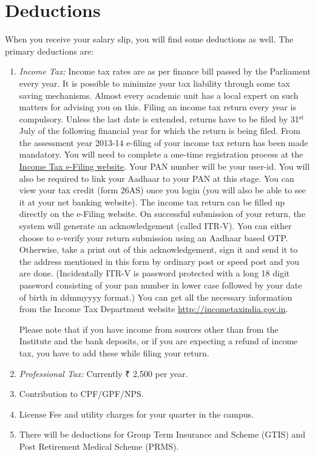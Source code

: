\documentclass[
  10pt,
  a5paper,
  10pt,
  openany]{amsbook}
\begin{document}
\section{Deductions}\label{deductions}

When you receive your salary slip, you will find some deductions as
well. The primary deductions are:

\begin{enumerate}
\def\labelenumi{\arabic{enumi}.}
\item
  \emph{Income Tax:} Income tax rates are as per finance bill passed by
  the Parliament every year. It is possible to minimize your tax
  liability through some tax saving mechanisms. Almost every academic
  unit has a local expert on such matters for advising you on this.
  Filing an income tax return every year is compulsory. Unless the last
  date is extended, returns have to be filed by 31\(^{\text{st}}\) July
  of the following financial year for which the return is being filed.
  From the assessment year 2013-14 e-filing of your income tax return
  has been made mandatory. You will need to complete a one-time
  registration process at the
  \href{https://www.incometax.gov.in/iec/foportal/}{Income Tax e-Filing
  website}. Your PAN number will be your user-id. You will also be
  required to link your Aadhaar to your PAN at this stage. You can view
  your tax credit (form 26AS) once you login (you will also be able to
  see it at your net banking website). The income tax return can be
  filled up directly on the e-Filing website. On successful submission
  of your return, the system will generate an acknowledgement (called
  ITR-V). You can either choose to e-verify your return submission using
  an Aadhaar based OTP. Otherwise, take a print out of this
  acknowledgement, sign it and send it to the address mentioned in this
  form by ordinary post or speed post and you are done. (Incidentally
  ITR-V is password protected with a long 18 digit password consisting
  of your pan number in lower case followed by your date of birth in
  ddmmyyyy format.) You can get all the necessary information from the
  Income Tax Department website \url{http://incometaxindia.gov.in}.

  Please note that if you have income from sources other than from the
  Institute and the bank deposits, or if you are expecting a refund of
  income tax, you have to add these while filing your return.
\item
  \emph{Professional Tax:} Currently ₹ 2,500 per year.
\item
  Contribution to CPF/GPF/NPS.
\item
  License Fee and utility charges for your quarter in the campus.
\item
  There will be deductions for Group Term Insurance and Scheme (GTIS)
  and Post Retirement Medical Scheme (PRMS).
\end{enumerate}
\end{document}
